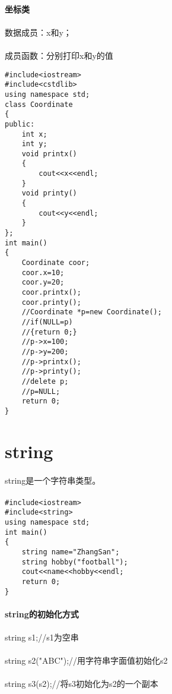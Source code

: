 \documentclass{article}
\begin{document}
\begin{CJK}{UTF8}{gbsn}
\paragraph{坐标类}
\paragraph{}
数据成员：x和y；
\paragraph{}
成员函数：分别打印x和y的值
\begin{verbatim}
#include<iostream>
#include<cstdlib>
using namespace std;
class Coordinate
{
public:
	int x;
	int y;
	void printx()
	{
		cout<<x<<endl;
	}
	void printy()
	{
		cout<<y<<endl;
	}
};
int main()
{
	Coordinate coor;
	coor.x=10;
	coor.y=20;
	coor.printx();
	coor.printy();
	//Coordinate *p=new Coordinate();
	//if(NULL=p)
	//{return 0;}
	//p->x=100;
	//p->y=200;
	//p->printx();
	//p->printy();
	//delete p;
	//p=NULL;
	return 0;
}
\end{verbatim}
\section{string}
\paragraph{}
string是一个字符串类型。
\paragraph{}
\begin{verbatim}
#include<iostream>
#include<string>
using namespace std;
int main()
{
	string name="ZhangSan";
	string hobby("football");
	cout<<name<<hobby<<endl;
	return 0;
}
\end{verbatim}
\paragraph{string的初始化方式}
\paragraph{}
string s1;//s1为空串
\paragraph{}
string s2("ABC");//用字符串字面值初始化s2
\paragraph{}
string s3(s2);//将s3初始化为s2的一个副本

\end{CJK}
\end{document}
